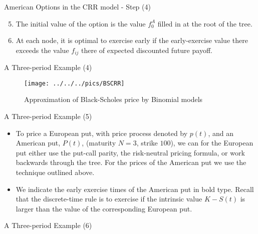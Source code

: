 {American Options in the CRR model - Step (4)}
\begin{enumerate}
\setcounter{enumi}{4}
  \item The initial value of the option is the value $f^A_0$ filled in
at the
root of the tree.
  \item At each node, it is optimal to exercise early if the
early-exercise value there exceeds the value $f_{ij}$ there of
expected discounted future payoff.
\end{enumerate}

{ A Three-period Example (4)}

\begin{figure}[htb]
\begin{center}
  \texttt{[image: ../../../pics/BSCRR]}
\caption{Approximation of Black-Scholes price by Binomial models}
\end{center}\label{BSCRR}
\end{figure}


{ A Three-period Example (5)}

\begin{itemize}
  \item To price a European put, with price process denoted by $p(t)$, and
an American put, $P(t)$, (maturity $N=3$, strike $100$), we can
for the European put either use the put-call parity, the risk-neutral pricing formula, or work
backwards through the tree. For the prices of the American put we
use the technique outlined above.
\item We indicate the early exercise times of the American put in bold
type. Recall that the discrete-time rule is to exercise if the
intrinsic value $K-S(t)$ is larger than the value of the
corresponding European put.
\end{itemize}

{ A Three-period Example (6)}

